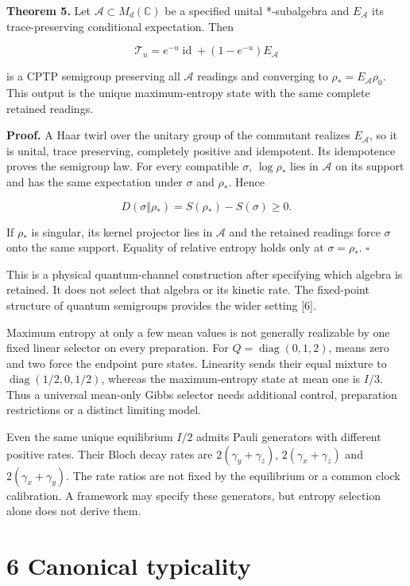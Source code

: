 \documentclass[
  11pt,
  a4paper,
]{article}
\begin{document}
\textbf{Theorem 5.} Let \(\mathcal A\subset M_d(\mathbb C)\) be a specified unital *-subalgebra and \(E_{\mathcal A}\) its trace-preserving conditional expectation. Then

\[\mathcal T_u=e^{-u}\operatorname{id}+(1-e^{-u})E_{\mathcal A}\]

is a CPTP semigroup preserving all \(\mathcal A\) readings and converging to \(\rho_*=E_{\mathcal A}\rho_0\). This output is the unique maximum-entropy state with the same complete retained readings.

\textbf{Proof.} A Haar twirl over the unitary group of the commutant realizes \(E_{\mathcal A}\), so it is unital, trace preserving, completely positive and idempotent. Its idempotence proves the semigroup law. For every compatible \(\sigma\), \(\log\rho_*\) lies in \(\mathcal A\) on its support and has the same expectation under \(\sigma\) and \(\rho_*\). Hence

\[D(\sigma\Vert\rho_*)=S(\rho_*)-S(\sigma)\ge0.\]

If \(\rho_*\) is singular, its kernel projector lies in \(\mathcal A\) and the retained readings force \(\sigma\) onto the same support. Equality of relative entropy holds only at \(\sigma=\rho_*\). \(\square\)

This is a physical quantum-channel construction after specifying which algebra is retained. It does not select that algebra or its kinetic rate. The fixed-point structure of quantum semigroups provides the wider setting {[}6{]}.

Maximum entropy at only a few mean values is not generally realizable by one fixed linear selector on every preparation. For \(Q=\operatorname{diag}(0,1,2)\), means zero and two force the endpoint pure states. Linearity sends their equal mixture to \(\operatorname{diag}(1/2,0,1/2)\), whereas the maximum-entropy state at mean one is \(I/3\). Thus a universal mean-only Gibbs selector needs additional control, preparation restrictions or a distinct limiting model.

Even the same unique equilibrium \(I/2\) admits Pauli generators with different positive rates. Their Bloch decay rates are \(2(\gamma_y+\gamma_z)\), \(2(\gamma_x+\gamma_z)\) and \(2(\gamma_x+\gamma_y)\). The rate ratios are not fixed by the equilibrium or a common clock calibration. A framework may specify these generators, but entropy selection alone does not derive them.

\section{6 Canonical typicality}\label{canonical-typicality}
\end{document}
